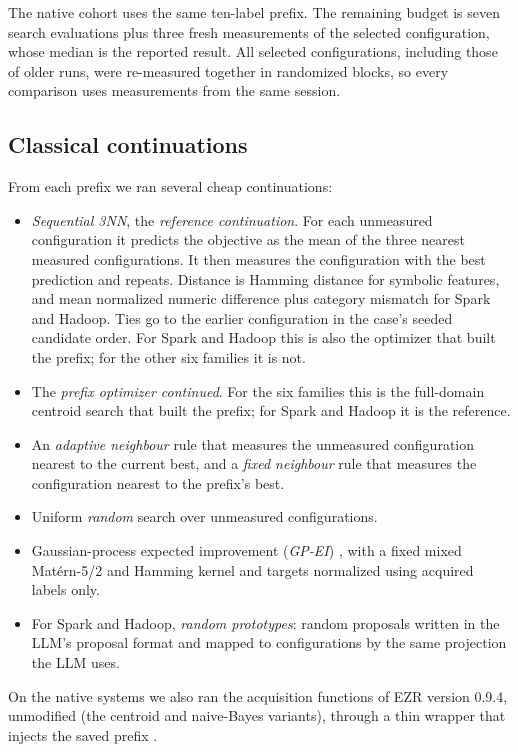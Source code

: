 The native cohort uses the same ten-label prefix. The remaining budget is seven search evaluations plus three fresh measurements of the selected configuration, whose median is the reported result. All selected configurations, including those of older runs, were re-measured together in randomized blocks, so every comparison uses measurements from the same session.

\subsection{Classical continuations}

From each prefix we ran several cheap continuations:
\begin{itemize}
  \item \emph{Sequential 3NN}, the \emph{reference continuation}. For each unmeasured configuration it predicts the objective as the mean of the three nearest measured configurations. It then measures the configuration with the best prediction and repeats. Distance is Hamming distance for symbolic features, and mean normalized numeric difference plus category mismatch for Spark and Hadoop. Ties go to the earlier configuration in the case's seeded candidate order. For Spark and Hadoop this is also the optimizer that built the prefix; for the other six families it is not.
  \item The \emph{prefix optimizer continued}. For the six families this is the full-domain centroid search that built the prefix; for Spark and Hadoop it is the reference.
  \item An \emph{adaptive neighbour} rule that measures the unmeasured configuration nearest to the current best, and a \emph{fixed neighbour} rule that measures the configuration nearest to the prefix's best.
  \item Uniform \emph{random} search over unmeasured configurations.
  \item Gaussian-process expected improvement (\emph{GP-EI}) \cite{jones1998ego}, with a fixed mixed Mat\'ern-5/2 and Hamming kernel and targets normalized using acquired labels only.
  \item For Spark and Hadoop, \emph{random prototypes}: random proposals written in the LLM's proposal format and mapped to configurations by the same projection the LLM uses.
\end{itemize}
On the native systems we also ran the acquisition functions of EZR version 0.9.4, unmodified (the centroid and naive-Bayes variants), through a thin wrapper that injects the saved prefix \cite{menzies2026ezr}.


